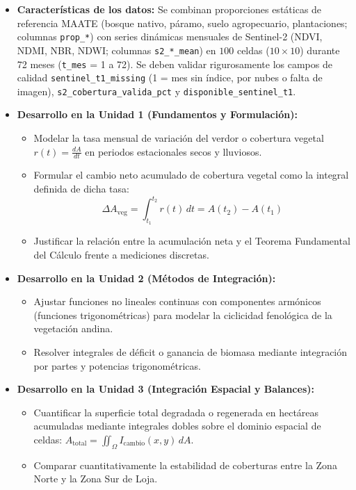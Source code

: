 \documentclass[11pt,a4paper]{article}
\begin{document}
\begin{itemize}[leftmargin=*,itemsep=1.5pt]
  \item \textbf{Características de los datos:} Se combinan proporciones estáticas de referencia MAATE (bosque nativo, páramo, suelo agropecuario, plantaciones; columnas \texttt{prop\_*}) con series dinámicas mensuales de Sentinel-2 (NDVI, NDMI, NBR, NDWI; columnas \texttt{s2\_*\_mean}) en $100$ celdas ($10\times10$) durante 72 meses (\texttt{t\_mes} = 1 a 72). Se deben validar rigurosamente los campos de calidad \texttt{sentinel\_t1\_missing} (1 = mes sin índice, por nubes o falta de imagen), \texttt{s2\_cobertura\_valida\_pct} y \texttt{disponible\_sentinel\_t1}.
  \item \textbf{Desarrollo en la Unidad 1 (Fundamentos y Formulación):}
  \begin{itemize}
    \item Modelar la tasa mensual de variación del verdor o cobertura vegetal $r(t) = \frac{dA}{dt}$ en periodos estacionales secos y lluviosos.
    \item Formular el cambio neto acumulado de cobertura vegetal como la integral definida de dicha tasa:
    \begin{equation*}
      \Delta A_{\text{veg}} = \int_{t_1}^{t_2} r(t)\,dt = A(t_2) - A(t_1)
    \end{equation*}
    \item Justificar la relación entre la acumulación neta y el Teorema Fundamental del Cálculo frente a mediciones discretas.
  \end{itemize}
  \item \textbf{Desarrollo en la Unidad 2 (Métodos de Integración):}
  \begin{itemize}
    \item Ajustar funciones no lineales continuas con componentes armónicos (funciones trigonométricas) para modelar la ciclicidad fenológica de la vegetación andina.
    \item Resolver integrales de déficit o ganancia de biomasa mediante integración por partes y potencias trigonométricas.
  \end{itemize}
  \item \textbf{Desarrollo en la Unidad 3 (Integración Espacial y Balances):}
  \begin{itemize}
    \item Cuantificar la superficie total degradada o regenerada en hectáreas acumuladas mediante integrales dobles sobre el dominio espacial de celdas: $A_{\text{total}} = \iint_{\Omega} I_{\text{cambio}}(x,y)\,dA$.
    \item Comparar cuantitativamente la estabilidad de coberturas entre la Zona Norte y la Zona Sur de Loja.
  \end{itemize}
\end{itemize}
\end{document}
